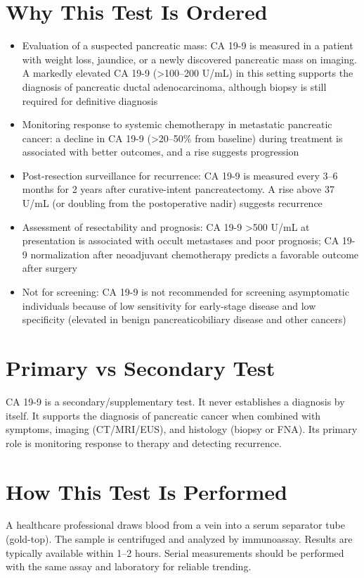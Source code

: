 \section*{Why This Test Is Ordered}
\begin{itemize}
  \item Evaluation of a suspected pancreatic mass: CA 19-9 is measured in a patient with weight loss, jaundice, or a newly discovered pancreatic mass on imaging. A markedly elevated CA 19-9 (>100--200 U/mL) in this setting supports the diagnosis of pancreatic ductal adenocarcinoma, although biopsy is still required for definitive diagnosis
  \item Monitoring response to systemic chemotherapy in metastatic pancreatic cancer: a decline in CA 19-9 (>20--50\% from baseline) during treatment is associated with better outcomes, and a rise suggests progression
  \item Post-resection surveillance for recurrence: CA 19-9 is measured every 3--6 months for 2 years after curative-intent pancreatectomy. A rise above 37 U/mL (or doubling from the postoperative nadir) suggests recurrence
  \item Assessment of resectability and prognosis: CA 19-9 >500 U/mL at presentation is associated with occult metastases and poor prognosis; CA 19-9 normalization after neoadjuvant chemotherapy predicts a favorable outcome after surgery
  \item Not for screening: CA 19-9 is not recommended for screening asymptomatic individuals because of low sensitivity for early-stage disease and low specificity (elevated in benign pancreaticobiliary disease and other cancers)
\end{itemize}

\section*{Primary vs Secondary Test}
CA 19-9 is a secondary/supplementary test. It never establishes a diagnosis by itself. It supports the diagnosis of pancreatic cancer when combined with symptoms, imaging (CT/MRI/EUS), and histology (biopsy or FNA). Its primary role is monitoring response to therapy and detecting recurrence.

\section*{How This Test Is Performed}
A healthcare professional draws blood from a vein into a serum separator tube (gold-top). The sample is centrifuged and analyzed by immunoassay. Results are typically available within 1--2 hours. Serial measurements should be performed with the same assay and laboratory for reliable trending.

